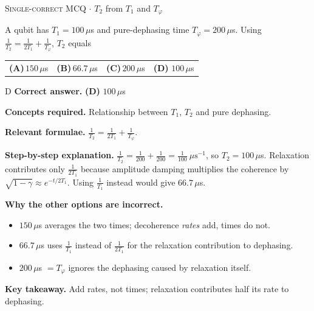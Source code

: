 \documentclass[11pt,a4paper]{article}
\newcommand{\optlabel}[1]{\textbf{(#1)}}
\newcommand{\correctlabel}[1]{\textcolor{okgreen}{\textbf{(#1)}\,\ding{51}}}
\newenvironment{qitem}[1]{\begin{list}{}{\setlength{\leftmargin}{3.3em}\setlength{\labelwidth}{3.1em}%
  \setlength{\labelsep}{0.2em}\setlength{\topsep}{3pt}\setlength{\parsep}{3pt}}\item[\textbf{Q.#1}\hfill]}{\end{list}}
\newcommand{\qsep}{\par\vspace{2pt}{\color{black!15}\hrule}\vspace{4pt}}
\newcommand{\qmeta}[2]{{\footnotesize\color{black!60}\textsc{#1} \;$\cdot$\; #2}\par}
\begin{document}
\begin{qitem}{27}
\qmeta{Single-correct MCQ}{$T_2$ from $T_1$ and $T_\varphi$}
A qubit has $T_1 = 100\,\mu$s and pure-dephasing time $T_\varphi = 200\,\mu$s. Using $\frac{1}{T_2} = \frac{1}{2T_1} + \frac{1}{T_\varphi}$, $T_2$ equals
\par\smallskip\noindent\begin{tabularx}{\linewidth}{@{}*{4}{L}@{}}
\optlabel{A}\,$150\,\mu$s & \optlabel{B}\,$66.7\,\mu$s & \optlabel{C}\,$200\,\mu$s & \correctlabel{D}\,$100\,\mu$s
\end{tabularx}
\end{qitem}
\begin{solbox}{D}
\textbf{\color{brand}Correct answer.} \textcolor{okgreen}{\textbf{(D)}} $100\,\mu$s

\textbf{\color{brand}Concepts required.} Relationship between $T_1$, $T_2$ and pure dephasing.

\textbf{\color{brand}Relevant formulae.} $\frac{1}{T_2} = \frac{1}{2T_1} + \frac{1}{T_\varphi}$.

\textbf{\color{brand}Step-by-step explanation.} $\frac{1}{T_2} = \frac{1}{200} + \frac{1}{200} = \frac{1}{100}\ \mu\text{s}^{-1}$, so $T_2 = 100\,\mu$s. Relaxation contributes only $\frac{1}{2T_1}$ because amplitude
damping multiplies the coherence by $\sqrt{1 - \gamma} \approx e^{-t/2T_1}$. Using $\frac1{T_1}$ instead would give $66.7\,\mu$s.

\textbf{\color{brand}Why the other options are incorrect.}
\begin{itemize}[leftmargin=2.4em, itemsep=1pt, topsep=2pt]
\item[\textbf{(A)}] $150\,\mu$s averages the two times; decoherence \emph{rates} add, times do not.
\item[\textbf{(B)}] $66.7\,\mu$s uses $\frac{1}{T_1}$ instead of $\frac{1}{2T_1}$ for the relaxation contribution to dephasing.
\item[\textbf{(C)}] $200\,\mu$s $= T_\varphi$ ignores the dephasing caused by relaxation itself.
\end{itemize}
\textbf{\color{brand}Key takeaway.} Add rates, not times; relaxation contributes half its rate to dephasing.
\end{solbox}
\qsep
\end{document}
